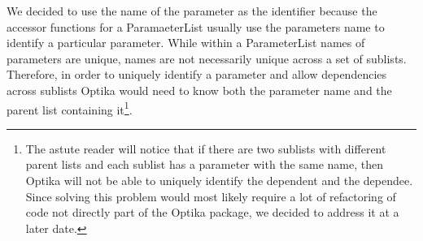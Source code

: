 	We decided to use the name of the parameter as the identifier because the accessor functions for a ParamaeterList usually use the parameters name to identify a particular parameter. 
	While within a ParameterList names of parameters are unique, names are not necessarily unique across a set of sublists. Therefore, in order to uniquely identify a 
	parameter and allow dependencies across sublists Optika would need to know both the parameter name and the parent list containing it\footnote{The astute reader will notice 
	that if there are two sublists with different parent lists and each sublist has a parameter with the same name, then Optika will not be able to uniquely identify the 
	dependent and the dependee. Since solving this problem would most likely require a lot of refactoring of code not directly part of the Optika package, we decided to address it
	at a later date.}.  

